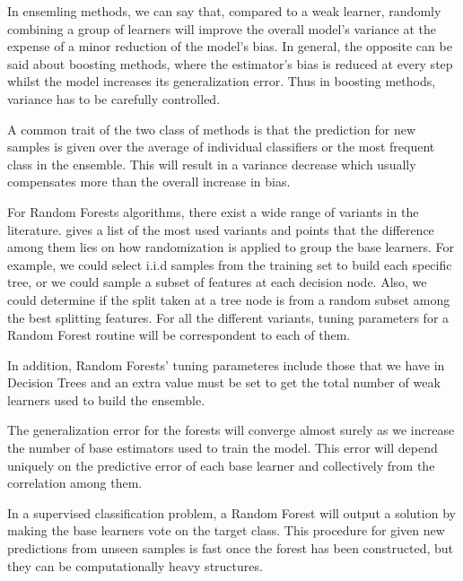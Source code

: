 \documentclass{article}%
\theoremstyle{definition}
\begin{document}
In ensemling methods, we can say that, compared to a weak learner, randomly combining a group of learners will improve the overall model's variance at the expense of a minor reduction of the model's bias. In general, the opposite can be said about boosting methods, where the estimator's bias is reduced at every step whilst the model increases its generalization error. Thus in boosting methods, variance has to be carefully controlled. 

A common trait of the two class of methods is that the prediction for new samples is given over the average of individual classifiers or the most frequent class in the ensemble.  This will result in a variance decrease which usually compensates more than the overall increase in bias.


For Random Forests algorithms, there exist a wide range of variants in the literature.  \cite{breiman-randomforests}  gives a list of the most used variants and points that the difference among them lies on how randomization is applied to group the base learners.  For example, we could select i.i.d samples from the training set to build each specific tree, or we could sample a subset of features at each decision node. Also, we could determine if the split taken at a tree node is from a random subset among the best splitting features. For all the different variants, tuning parameters for a Random Forest routine will be correspondent to each of them.

In addition, Random Forests' tuning parameteres include those that we have in Decision Trees and an extra value must be set to get the total number of weak learners used to build the ensemble. 


The generalization error for the forests will converge almost surely as we increase the number of base estimators used to train the model. This error will depend uniquely on the predictive error of each base learner and collectively from the correlation among them.

In a supervised classification problem, a Random Forest will output a solution by making the base learners vote on the  target class. This procedure for given new predictions from unseen samples is fast once the forest has been constructed, but they can be computationally heavy structures.


\textit{}
\end{document}
